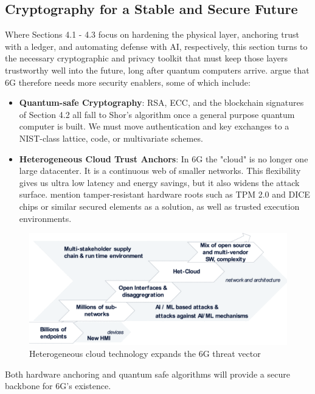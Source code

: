 \documentclass[acmtog]{acmart}
\begin{document}
\subsection{Cryptography for a Stable and Secure Future}
Where Sections 4.1 - 4.3 focus on hardening the physical layer, anchoring trust with a ledger, and automating defense with AI, respectively, this section turns to the necessary cryptographic and privacy toolkit that must keep those layers trustworthy well into the future, long after quantum computers arrive. \cite{ref8} argue that 6G therefore needs more security enablers, some of which include:
\begin{itemize}
  \item \textbf{Quantum-safe Cryptography}: RSA, ECC, and the blockchain signatures of Section 4.2 all fall to Shor's algorithm once a general purpose quantum computer is built. We must move authentication and key exchanges to a NIST-class lattice, code, or multivariate schemes. 
  \item \textbf{Heterogeneous Cloud Trust Anchors}: In 6G the "cloud" is no longer one large datacenter. It is a continuous web of smaller networks. This flexibility gives us ultra low latency and energy savings, but it also widens the attack surface. \cite{ref8} mention tamper-resistant hardware roots such as TPM 2.0 and DICE chips or similar secured elements as a solution, as well as trusted execution environments.
\end{itemize}
\begin{figure}[h]
  \centering
  \includegraphics[width=\linewidth]{4.4.png}
  \caption{Heterogeneous cloud technology expands the 6G threat vector \cite{ref8}}
\end{figure}
Both hardware anchoring and quantum safe algorithms will provide a secure backbone for 6G's existence.
\end{document}

